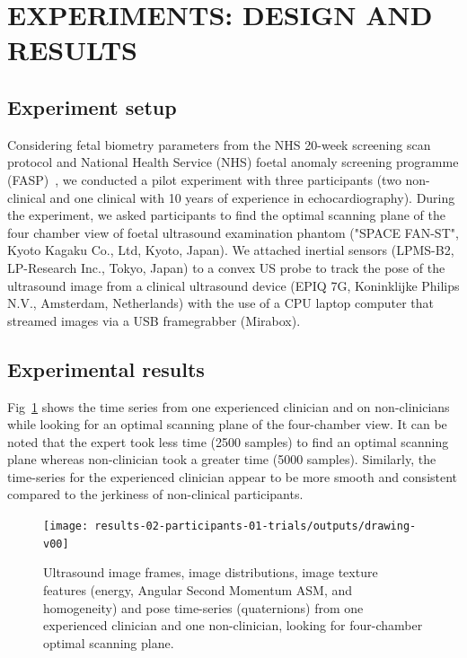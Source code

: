 \documentclass[a4paper, 10pt, conference]{ieeeconf}      %
\begin{document}

\section{EXPERIMENTS: DESIGN AND RESULTS}
\subsection{Experiment setup}
Considering fetal biometry parameters from the NHS 20-week screening scan protocol and National Health Service (NHS) foetal anomaly screening programme (FASP)~\cite{NHS_england2022},
we conducted a pilot experiment with three participants (two non-clinical and one clinical with 10 years of experience in echocardiography).
During the experiment, we asked participants to find the optimal scanning plane of the four chamber view of foetal ultrasound examination phantom ("SPACE FAN-ST", Kyoto Kagaku Co., Ltd, Kyoto, Japan).
We attached inertial sensors (LPMS-B2, LP-Research Inc., Tokyo, Japan) to a convex US probe to track the pose of the ultrasound image from a clinical ultrasound device (EPIQ 7G, Koninklijke Philips N.V., Amsterdam, Netherlands) with the use of a CPU laptop computer that streamed images via a USB framegrabber (Mirabox).

\subsection{Experimental results}
Fig~\ref{fig:results} shows the time series from one experienced clinician and on non-clinicians while looking for an optimal scanning plane of the four-chamber view.
It can be noted that the expert took less time (2500 samples) to find an optimal scanning plane whereas non-clinician took a greater time (5000 samples).
Similarly, the time-series for the experienced clinician appear to be more smooth and consistent compared to the jerkiness of non-clinical participants. 
\begin{figure}[t]
\centering
\texttt{[image: results-02-participants-01-trials/outputs/drawing-v00]} %
\caption{
Ultrasound image frames, image distributions, image texture features (energy, Angular Second Momentum ASM, and homogeneity) and pose time-series (quaternions) from one experienced clinician and one non-clinician, looking for four-chamber optimal scanning plane. 
       } 
\label{fig:results}
\end{figure}
\end{document}
